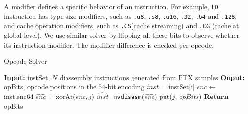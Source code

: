 A modifier defines a specific behavior of an instruction. 
For example, {\tt LD} instruction has type-size modifiers, such as {\tt .u8}, {\tt .s8}, {\tt .u16}, {\tt .32}, {\tt .64} and {\tt .128}, and cache operation modifiers, such as {\tt .CS}(cache streaming) and {\tt .CG} (cache at global level). 
We use similar solver by flipping all these bits to observe whether its instruction
modifier. The modifier difference is checked per opcode. %

\begin{algorithm}[htbp]
      \caption{Opcode Solver}\label{algo:opcode}
      {\footnotesize
      \begin{algorithmic}[1]
      \State \textbf {Input:} instSet, $N$ diassembly instructions generated from PTX samples
      \State \textbf {Onput:} opBits, opcode positions in the 64-bit encoding
      \State $inst$ = instSet[i]
      \State $enc \gets$ inst.enc64
      \State $\widehat{enc}$ = xorAt($enc, j$)
      \State $\widehat{inst}$={\tt nvdisasm}($\widehat{enc}$)
      \State put($j$, $opBits$)
      \EndIf
      \EndFor
      \EndFor
      \State \textbf{Return} opBits 
  \end{algorithmic}
  }
\end{algorithm}

